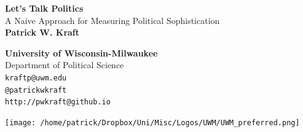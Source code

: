 \documentclass[a0,landscape]{a0poster}
\begin{document}


\begin{minipage}[b]{0.51\linewidth}
\veryHuge \color{NavyBlue} \textbf{Let's Talk Politics} \color{Black}\\[.5cm] %
\Huge A Naive Approach for Measuring Political Sophistication\\[1cm] %
\huge \textbf{Patrick W. Kraft} %
\end{minipage}
%
\begin{minipage}[b]{0.25\linewidth}
\color{DarkSlateGray}\Large \textbf{University of Wisconsin-Milwaukee}\\
Department of Political Science\\ %
\faEnvelope\hspace{.2em} \texttt{kraftp@uwm.edu}\\ %
\faTwitter\hspace{.2em} \texttt{@patrickwkraft}\\ %
\faGlobe\hspace{.2em} \texttt{http://pwkraft@github.io} %
\end{minipage}
%
\begin{minipage}[b]{0.25\linewidth}
\texttt{[image: /home/patrick/Dropbox/Uni/Misc/Logos/UWM/UWM\_preferred.png]}
\end{minipage}
%


\vspace{1cm} %
\end{document}

